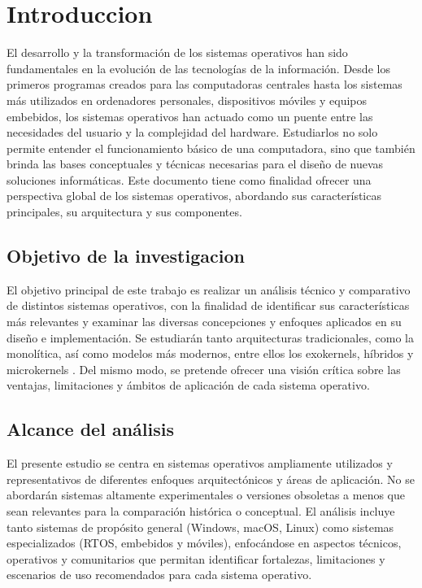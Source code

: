 \chapter*{Introduccion}

El desarrollo y la transformación de los sistemas operativos han sido fundamentales en la evolución de las tecnologías de la información. Desde los primeros programas creados para las computadoras centrales hasta los sistemas más utilizados en ordenadores personales, dispositivos móviles y equipos embebidos, los sistemas operativos han actuado como un puente entre las necesidades del usuario y la complejidad del hardware. Estudiarlos no solo permite entender el funcionamiento básico de una computadora, sino que también brinda las bases conceptuales y técnicas necesarias para el diseño de nuevas soluciones informáticas. Este documento tiene como finalidad ofrecer una perspectiva global de los sistemas operativos, abordando sus características principales, su arquitectura y sus componentes.

\section*{Objetivo de la investigacion}

El objetivo principal de este trabajo es realizar un análisis técnico y comparativo de distintos sistemas operativos, con la finalidad de identificar sus características más relevantes y examinar las diversas concepciones y enfoques aplicados en su diseño e implementación. Se estudiarán tanto arquitecturas tradicionales, como la monolítica, así como modelos más modernos, entre ellos los exokernels, híbridos y microkernels . Del mismo modo, se pretende ofrecer una visión crítica sobre las ventajas, limitaciones y ámbitos de aplicación de cada sistema operativo.

\section*{Alcance del análisis}
El presente estudio se centra en sistemas operativos ampliamente utilizados y representativos de diferentes enfoques arquitectónicos y áreas de aplicación. No se abordarán sistemas altamente experimentales o versiones obsoletas a menos que sean relevantes para la comparación histórica o conceptual. El análisis incluye tanto sistemas de propósito general (Windows, macOS, Linux) como sistemas especializados (RTOS, embebidos y móviles), enfocándose en aspectos técnicos, operativos y comunitarios que permitan identificar fortalezas, limitaciones y escenarios de uso recomendados para cada sistema operativo.

